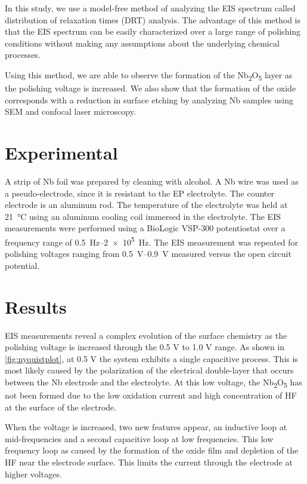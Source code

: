 \documentclass{revtex4-2}
\begin{document}
In this study, we use a model-free method of analyzing the EIS spectrum called distribution of relaxation times (DRT) analysis. The advantage of this method is that the EIS spectrum can be easily characterized over a large range of polishing conditions without making any assumptions about the underlying chemical processes. 

Using this method, we are able to observe the formation of the Nb\textsubscript{2}O\textsubscript{5} layer as the polishing voltage is increased. We also show that the formation of the oxide corresponds with a reduction in surface etching by analyzing Nb samples using SEM and confocal laser microscopy.


\section{Experimental}
\label{sec:orgb71f960}

A strip of Nb foil was prepared by cleaning with alcohol. A Nb wire was used as a pseudo-electrode, since it is resistant to the EP electrolyte. The counter electrode is an aluminum rod. The temperature of the electrolyte was held at \qty{21}{\celsius} using an aluminum cooling coil immersed in the electrolyte. The EIS measurements were performed using a BioLogic VSP-300 potentiostat over a frequency range of \qtyrange{0.5}{2e5}{\hertz}. The EIS measurement was repeated for polishing voltages ranging from \qtyrange{0.5}{0.9}{\volt} measured versus the open circuit potential.



\section{Results}
\label{sec:org4a45003}

EIS measurements reveal a complex evolution of the surface chemistry as the polishing voltage is increased through the 0.5 V to 1.0 V range. As shown in \ref{fig:nyquistplot}, at 0.5 V the system exhibits a single capacitive process. This is most likely caused by the polarization of the electrical double-layer that occurs between the Nb electrode and the electrolyte. At this low voltage, the Nb\textsubscript{2}O\textsubscript{5} has not been formed due to the low oxidation current and high concentration of HF at the surface of the electrode.

When the voltage is increased, two new features appear, an inductive loop at mid-frequencies and a second capacitive loop at low frequencies. This low frequency loop as caused by the formation of the oxide film and depletion of the HF near the electrode surface. This limits the current through the electrode at higher voltages. 
\end{document}
